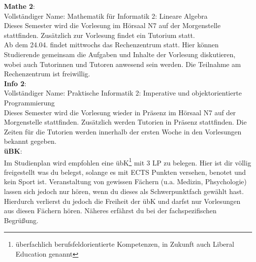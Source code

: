 \textbf{Mathe 2}:\\
Vollständiger Name: Mathematik für Informatik 2: Lineare Algebra\\
Dieses Semester wird die Vorlesung im Hörsaal N7 auf der Morgenstelle stattfinden.
Zusätzlich zur Vorlesung findet ein Tutorium statt. \\
Ab dem 24.04. findet mittwochs das Rechenzentrum statt. Hier können Studierende gemeinsam die Aufgaben und Inhalte der Vorlesung diskutieren,
wobei auch Tutorinnen und Tutoren anwesend sein werden. Die Teilnahme am Rechenzentrum ist freiwillig.\\

\textbf{Info 2}:\\
Vollständiger Name: Praktische Informatik 2: Imperative und objektorientierte Programmierung\\
Dieses Semester wird die Vorlesung wieder in Präsenz im Hörsaal N7 auf der Morgenstelle stattfinden.
Zusätzlich werden Tutorien in Präsenz stattfinden.
Die Zeiten für die Tutorien werden innerhalb der ersten Woche in den Vorlesungen bekannt gegeben.\\

\textbf{üBK}:\\
Im Studienplan wird empfohlen eine übK\footnote{überfachlich berufsfeldorientierte Kompetenzen, in Zukunft auch Liberal Education genannt}
mit 3 LP zu belegen. Hier ist dir völlig freigestellt was du belegst, solange es mit ECTS Punkten versehen, benotet und kein Sport ist.
Veranstaltung von gewissen Fächern (u.a. Medizin, Phsychologie) lassen sich jedoch nur hören, wenn du dieses als Schwerpunktfach gewählt hast.
Hierdurch verlierst du jedoch die Freiheit der übK und darfst nur Vorlesungen aus diesen Fächern hören. Näheres erfährst du bei der fachspezifischen Begrüßung.

